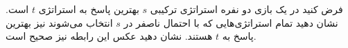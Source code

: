 فرض کنید در یک بازی دو نفره استراتژی ترکیبی 
$s$ 
بهترین پاسخ به استراتژی 
$t$ 
است. نشان دهید تمام استراتژی‌هایی که با احتمال ناصفر در 
$s$ 
انتخاب می‌شوند نیز بهترین پاسخ به 
$t$ 
هستند. نشان دهید عکس این رابطه نیز صحیح است.
